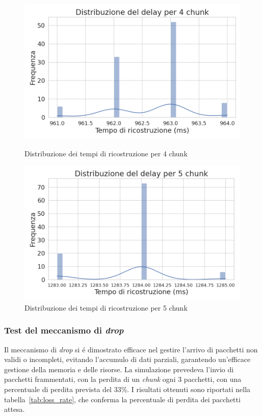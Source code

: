 \documentclass[12pt,a4paper,twoside]{book}
\begin{document}
\begin{figure}[H]
    \begin{minipage}{0.47\textwidth}
        \centering
        \includegraphics[width=\textwidth]{img/tests/T2/T2-dist-4chunks.png}
        \caption{Distribuzione dei tempi di ricostruzione per 4 chunk}
        \label{fig:segmentation-test-4chunks}
    \end{minipage}
    \hfill
    \begin{minipage}{0.47\textwidth}
        \centering
        \includegraphics[width=\textwidth]{img/tests/T2/T2-dist-5chunks.png}
        \caption{Distribuzione dei tempi di ricostruzione per 5 chunk}
        \label{fig:segmentation-test-5chunks}
    \end{minipage}
\end{figure}
\newpage
\subsubsection{Test del meccanismo di \emph{drop}}
Il meccanismo di \emph{drop} si \'e dimostrato efficace nel gestire l'arrivo di pacchetti
non validi o incompleti, evitando l'accumulo di dati parziali, garantendo un'efficace
gestione della memoria e delle risorse.
La simulazione prevedeva l'invio di pacchetti frammentati, con la perdita di un \emph{chunk}
ogni 3 pacchetti, con una percentuale di perdita prevista del 33\%.
I risultati ottenuti sono riportati nella tabella~\ref{tab:loss_rate}, che conferma la
percentuale di perdita dei pacchetti attesa.
\end{document}
